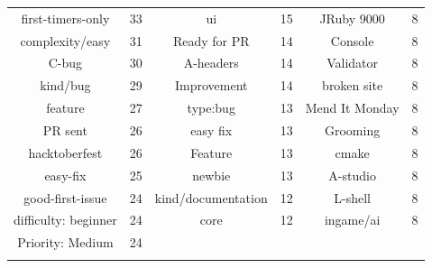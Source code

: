 \begin{table}[t]
\begin{tabular}{ c | c || c | c || c | c }
first-timers-only & 33 & ui & 15 & JRuby 9000 & 8 \\
complexity/easy & 31 & Ready for PR & 14 & Console & 8 \\
C-bug & 30 & A-headers & 14 & Validator & 8 \\
kind/bug & 29 & Improvement & 14 & broken site & 8 \\
feature & 27 & type:bug & 13 & Mend It Monday & 8 \\
PR sent & 26 & easy fix & 13 & Grooming & 8 \\
hacktoberfest & 26 & Feature & 13 & cmake & 8 \\
easy-fix & 25 & newbie & 13 & A-studio & 8 \\
good-first-issue & 24 & kind/documentation & 12 & L-shell & 8 \\
difficulty: beginner & 24 & core & 12 & ingame/ai & 8 \\
Priority: Medium & 24 & & & & \\

\Xhline{3\arrayrulewidth}
\end{tabular}
\end{table}




